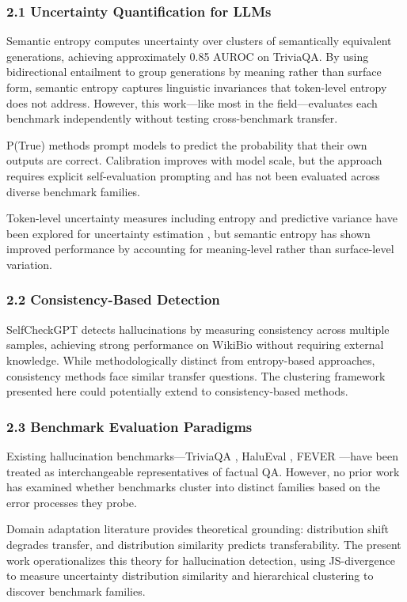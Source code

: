 
\subsubsection{2.1 Uncertainty Quantification for LLMs}

Semantic entropy \citep{kuhn2023semantic} computes uncertainty over clusters of semantically equivalent generations, achieving approximately 0.85 AUROC on TriviaQA. By using bidirectional entailment to group generations by meaning rather than surface form, semantic entropy captures linguistic invariances that token-level entropy does not address. However, this work---like most in the field---evaluates each benchmark independently without testing cross-benchmark transfer.

P(True) methods \citep{kadavath2022language} prompt models to predict the probability that their own outputs are correct. Calibration improves with model scale, but the approach requires explicit self-evaluation prompting and has not been evaluated across diverse benchmark families.

Token-level uncertainty measures including entropy and predictive variance have been explored for uncertainty estimation \citep{xiao2021hallucination}, but semantic entropy has shown improved performance by accounting for meaning-level rather than surface-level variation.

\subsubsection{2.2 Consistency-Based Detection}

SelfCheckGPT \citep{manakul2023selfcheckgpt} detects hallucinations by measuring consistency across multiple samples, achieving strong performance on WikiBio without requiring external knowledge. While methodologically distinct from entropy-based approaches, consistency methods face similar transfer questions. The clustering framework presented here could potentially extend to consistency-based methods.

\subsubsection{2.3 Benchmark Evaluation Paradigms}

Existing hallucination benchmarks---TriviaQA \citep{joshi2017triviaqa}, HaluEval \citep{li2023halueval}, FEVER \citep{thorne2018fever}---have been treated as interchangeable representatives of factual QA. However, no prior work has examined whether benchmarks cluster into distinct families based on the error processes they probe.

Domain adaptation literature \citep{bendavid2010theory} provides theoretical grounding: distribution shift degrades transfer, and distribution similarity predicts transferability. The present work operationalizes this theory for hallucination detection, using JS-divergence to measure uncertainty distribution similarity and hierarchical clustering to discover benchmark families.

